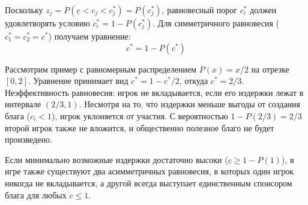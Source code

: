\begin{example}
Поскольку $z_j = P(\underline{c} < c_j < c_j^*) = P(c_j^*)$, равновесный порог $c_i^*$ должен удовлетворять условию $c_i^* = 1 - P(c_j^*)$. Для симметричного равновесия ($c_1^* = c_2^* = c^*$) получаем уравнение:
\[
c^* = 1 - P(c^*)
\]

Рассмотрим пример с равномерным распределением $P(x) = x/2$ на отрезке $[0, 2]$. Уравнение принимает вид $c^* = 1 - c^*/2$, откуда $c^* = 2/3$.
Неэффективность равновесия: игрок не вкладывается, если его издержки лежат в интервале $(2/3, 1)$. Несмотря на то, что издержки меньше выгоды от создания блага ($c_i < 1$), игрок уклоняется от участия. С вероятностью $1 - P(2/3) = 2/3$ второй игрок также не вложится, и общественно полезное благо не будет произведено.

\begin{remark}
Если минимально возможные издержки достаточно высоки ($\underline{c} \ge 1 - P(1)$), в игре также существуют два асимметричных равновесия, в которых один игрок никогда не вкладывается, а другой всегда выступает единственным спонсором блага для любых $c \le 1$.
\end{remark}
\end{example}
